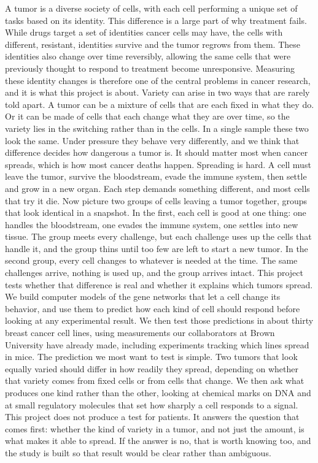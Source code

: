 A tumor is a diverse society of cells, with each cell performing a unique set of tasks based on its identity. This difference is a large part of why treatment fails. While drugs target a set of identities cancer cells may have, the cells with different, resistant, identities survive and  the tumor regrows from them. These identities also change over time reversibly, allowing the same cells that were previously thought to respond to treatment become unresponsive. Measuring these identity changes is therefore one of the central problems in cancer research, and it is what this project is about.
Variety can arise in two ways that are rarely told apart. A tumor can be a mixture of cells that are each fixed in what they do. Or it can be made of cells that each change what they are over time, so the variety lies in the switching rather than in the cells. In a single sample these two look the same. Under pressure they behave very differently, and we think that difference decides how dangerous a tumor is.
It should matter most when cancer spreads, which is how most cancer deaths happen. Spreading is hard. A cell must leave the tumor, survive the bloodstream, evade the immune system, then settle and grow in a new organ. Each step demands something different, and most cells that try it die.
Now picture two groups of cells leaving a tumor together, groups that look identical in a snapshot. In the first, each cell is good at one thing: one handles the bloodstream, one evades the immune system, one settles into new tissue. The group meets every challenge, but each challenge uses up the cells that handle it, and the group thins until too few are left to start a new tumor. In the second group, every cell changes to whatever is needed at the time. The same challenges arrive, nothing is used up, and the group arrives intact.
This project tests whether that difference is real and whether it explains which tumors spread. We build computer models of the gene networks that let a cell change its behavior, and use them to predict how each kind of cell should respond before looking at any experimental result. We then test those predictions in about thirty breast cancer cell lines, using measurements our collaborators at Brown University have already made, including experiments tracking which lines spread in mice.
The prediction we most want to test is simple. Two tumors that look equally varied should differ in how readily they spread, depending on whether that variety comes from fixed cells or from cells that change. We then ask what produces one kind rather than the other, looking at chemical marks on DNA and at small regulatory molecules that set how sharply a cell responds to a signal.
This project does not produce a test for patients. It answers the question that comes first: whether the kind of variety in a tumor, and not just the amount, is what makes it able to spread. If the answer is no, that is worth knowing too, and the study is built so that result would be clear rather than ambiguous.
